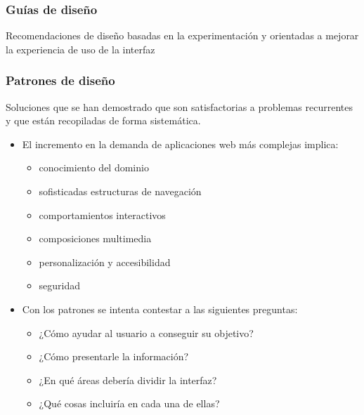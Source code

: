\documentclass[12pt, twoside, openright]{report} %
\begin{document}
\subsubsection{Guías de diseño}
Recomendaciones de diseño basadas en la
experimentación y orientadas a mejorar la experiencia de uso de la
interfaz

\subsubsection{Patrones de diseño}
Soluciones que se han demostrado que son
satisfactorias a problemas recurrentes y que están recopiladas de
forma sistemática.

\begin{itemize}
	\item El incremento en la demanda de aplicaciones web más complejas
	      implica:
	      \vspace{-0.5cm}

	      \begin{itemize}
		      \item conocimiento del dominio

		      \item sofisticadas estructuras de navegación

		      \item comportamientos interactivos

		      \item composiciones multimedia

		      \item personalización y accesibilidad

		      \item seguridad
	      \end{itemize}
	\item Con los patrones se intenta contestar a las siguientes
	      preguntas:
	      \vspace{-0.5cm}
	      \begin{itemize}
		      \item ¿Cómo ayudar al usuario a conseguir su objetivo?

		      \item ¿Cómo presentarle la información?

		      \item ¿En qué áreas debería dividir la interfaz?

		      \item ¿Qué cosas incluiría en cada una de ellas?


\end{itemize}
\end{itemize}
\end{document}
